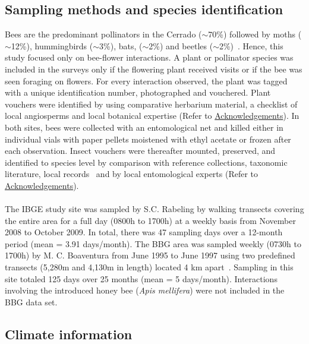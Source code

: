 \documentclass[11pt]{article}
\begin{document}
\subsection{Sampling methods and species identification}
Bees are the predominant pollinators in the Cerrado ($\sim$70\%) followed by moths ($\sim$12\%), hummingbirds ($\sim$3\%), bats, ($\sim$2\%) and beetles ($\sim$2\%)~\citep{Oliveira2002, Gottsberger2006a, Cappellari2011}. Hence, this study focused only on bee-flower interactions. A plant or pollinator species was included in the surveys only if the flowering plant received visits or if the bee was seen foraging on flowers. For every interaction observed, the plant was tagged with a unique identification number, photographed and vouchered. Plant vouchers were identified by using comparative herbarium material, a checklist of local angiosperms and local botanical expertise (Refer to \hyperref[sec: acknowledgements]{Acknowledgements}).  In both sites, bees were collected with an entomological net and killed either in individual vials with paper pellets moistened with ethyl acetate or frozen after each observation. Insect vouchers were thereafter mounted, preserved, and identified to species level by comparison with reference collections, taxonomic literature, local records~\citep{Moure1962, Silveira2002, Michener2007, Moure2007} and by local entomological experts (Refer to \hyperref[sec: acknowledgements]{Acknowledgements}). \\
\\
The IBGE study site was sampled by S.C. Rabeling by walking transects covering the entire area for a full day (0800h to 1700h) at a weekly basis from November 2008 to October 2009. In total, there was 47 sampling days over a 12-month period (mean = 3.91 days/month). The BBG area was sampled weekly (0730h to 1700h) by M. C. Boaventura from June 1995 to June 1997 using two predefined transects (5,280m and 4,130m in length) located 4 km apart~\citep{Boaventura1998}. Sampling in this site totaled 125 days over 25 months (mean = 5 days/month). Interactions involving the introduced honey bee (\textit{Apis mellifera}) were not included in the BBG data set.

\subsection{Climate information}
\end{document}
